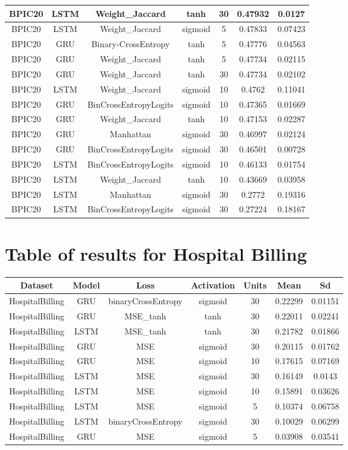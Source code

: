 \documentclass{article}%
\begin{document}
\begin{longtable}{|c|c|c|c|c|c|c|}
\hline%
BPIC20&LSTM&Weight\_Jaccard&tanh&30&0.47932&0.0127\\%
\hline%
BPIC20&LSTM&Weight\_Jaccard&sigmoid&5&0.47833&0.07423\\%
\hline%
BPIC20&GRU&Binary{-}CrossEntropy&tanh&5&0.47776&0.04563\\%
\hline%
BPIC20&GRU&Weight\_Jaccard&tanh&5&0.47734&0.02115\\%
\hline%
BPIC20&GRU&Weight\_Jaccard&tanh&30&0.47734&0.02102\\%
\hline%
BPIC20&LSTM&Weight\_Jaccard&sigmoid&10&0.4762&0.11041\\%
\hline%
BPIC20&GRU&BinCrossEntropyLogits&sigmoid&10&0.47365&0.01669\\%
\hline%
BPIC20&GRU&Weight\_Jaccard&tanh&10&0.47153&0.02287\\%
\hline%
BPIC20&GRU&Manhattan&sigmoid&30&0.46997&0.02124\\%
\hline%
BPIC20&GRU&BinCrossEntropyLogits&sigmoid&30&0.46501&0.00728\\%
\hline%
BPIC20&LSTM&BinCrossEntropyLogits&sigmoid&10&0.46133&0.01754\\%
\hline%
BPIC20&LSTM&Weight\_Jaccard&tanh&10&0.43669&0.03958\\%
\hline%
BPIC20&LSTM&Manhattan&sigmoid&30&0.2772&0.19316\\%
\hline%
BPIC20&LSTM&BinCrossEntropyLogits&sigmoid&30&0.27224&0.18167\\%
\hline%
\end{longtable}

%
\newpage%
\section{Table of results for Hospital Billing}%
\label{sec:TableofresultsforHospitalBilling}%
\begin{longtable}{|c|c|c|c|c|c|c|}%
\hline%
\rowcolor{lightgray!70}%
\textbf{Dataset}&\textbf{Model}&\textbf{Loss}&\textbf{Activation}&\textbf{Units}&\textbf{Mean}&\textbf{Sd}\\%
\hline%
HospitalBilling&GRU&binaryCrossEntropy&sigmoid&30&0.22299&0.01151\\%
\hline%
HospitalBilling&GRU&MSE\_tanh&tanh&30&0.22011&0.02241\\%
\hline%
HospitalBilling&LSTM&MSE\_tanh&tanh&30&0.21782&0.01866\\%
\hline%
HospitalBilling&GRU&MSE&sigmoid&30&0.20115&0.01762\\%
\hline%
HospitalBilling&GRU&MSE&sigmoid&10&0.17615&0.07169\\%
\hline%
HospitalBilling&LSTM&MSE&sigmoid&30&0.16149&0.0143\\%
\hline%
HospitalBilling&LSTM&MSE&sigmoid&10&0.15891&0.03626\\%
\hline%
HospitalBilling&LSTM&MSE&sigmoid&5&0.10374&0.06758\\%
\hline%
HospitalBilling&LSTM&binaryCrossEntropy&sigmoid&30&0.10029&0.06299\\%
\hline%
HospitalBilling&GRU&MSE&sigmoid&5&0.03908&0.03541\\%
\hline%
\end{longtable}

%
\end{document}
